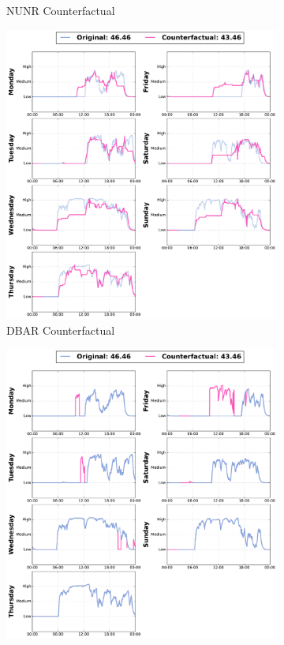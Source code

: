 \begin{figure}[h!]
\begin{subfigure}[b]{0.24\textwidth}
         \caption{NUNR Counterfactual}
         \label{fig:cf:nun}
     \end{subfigure}
     \hfill
     \begin{subfigure}[b]{0.24\textwidth}
         \centering
         \includegraphics[width=\textwidth]{images/6306/1_6306_TCN_DBA_cf.pdf}
         \caption{DBAR Counterfactual}
         \label{fig:cf:dba}
     \end{subfigure}
    \hfill
     \begin{subfigure}[b]{0.24\textwidth}
         \centering
         \includegraphics[width=\textwidth]{images/6306/2_6306_TCN_TSEvo_cf.pdf}

\end{subfigure}
\end{figure}
